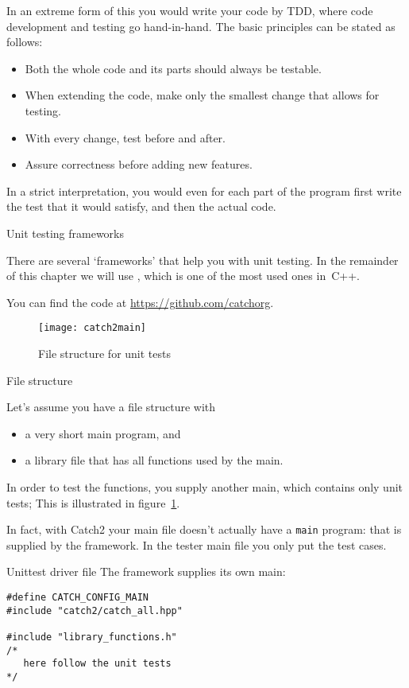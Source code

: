 In an extreme form of this you would write
your code by \acf{TDD}, where code development and testing
go hand-in-hand. The basic principles can be stated as follows:
\begin{itemize}
\item Both the whole code and its parts should always be testable.
\item When extending the code, make only the smallest change that allows for testing.
\item With every change, test before and after.
\item Assure correctness before adding new features.  
\end{itemize}
In a strict interpretation,
you would even for each part of the
program first write the test that it would satisfy,
and then the actual code.

 {Unit testing frameworks}
\label{sec:tdd}

There are several `frameworks' that help you with unit testing.
In the remainder of this chapter we will use ,
which is one of the most used ones in~C++.

You can find the code at \url{https://github.com/catchorg}.

\begin{figure}[t]
  \texttt{[image: catch2main]}
  \caption{File structure for unit tests}
  \label{fig:catch2main}
\end{figure}

 {File structure}

Let's assume you have a file structure with
\begin{itemize}
\item a very short main program, and
\item a library file that has all functions used by the main.
\end{itemize}
In order to test the functions, you supply another main,
which contains only unit tests;  
This is illustrated in figure~\ref{fig:catch2main}.

In fact, with Catch2 your main file doesn't actually have
a \lstinline{main} program: that is supplied by the framework.
In the tester main file you only put the test cases.

\begin{block}{Unittest driver file}
  \label{sl:catch2main}
The framework supplies its own main:
\begin{lstlisting}
#define CATCH_CONFIG_MAIN
#include "catch2/catch_all.hpp"

#include "library_functions.h"
/*
   here follow the unit tests
*/
\end{lstlisting}
\end{block}

